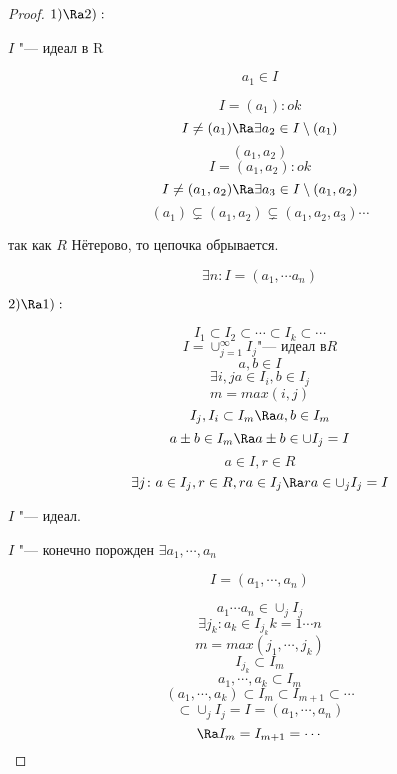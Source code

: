 \begin{proof}
\textbf{$1) \Ra 2):$}

$I$ "--- идеал в R

$$a_1 \in I$$

$$I = (a_1)\colon ok$$
$$I \ne (a_1) \Ra \exists a_2 \in I \setminus (a_1)$$
$$(a_1, a_2)$$
$$I = (a_1, a_2)\colon ok$$
$$I \ne (a_1, a_2) \Ra \exists a_3 \in I \setminus (a_1, a_2)$$
$$(a_1) \subsetneq (a_1, a_2) \subsetneq (a_1, a_2, a_3) \cdots$$

так как $R$ Нётерово, то цепочка обрывается. 

$$\exists n \colon  I = (a_1, \cdots a_n)$$

\textbf{$2) \Ra 1):$}

$$I_{1} \subset I_2 \subset \cdots \subset I_{k} \subset \cdots$$
$$I = \cup_{j = 1}^{\infty} I_{j} \text{"--- идеал в} R$$
$$a, b \in I$$
$$\exists i, j a \in I_{i}, b \in I_{j}$$
$$m = max(i, j)$$
$$I_j, I_i \subset I_{m} \Ra a, b \in I_{m}$$
$$a\pm b \in I_m \Ra a \pm b \in \cup I_{j} = I$$
$$a \in I, r \in R$$
$$\exists j \colon a \in I_j, r \in R, ra \in I_{j} \Ra ra \in \cup_{j}I_j = I$$

$I$ "--- идеал. 

$I$ "--- конечно порожден $\exists a_1, \cdots, a_n$

$$I = (a_1, \cdots, a_n)$$

$$a_1 \cdots a_n \in \cup_{j} I_j$$
$$\exists j_k\colon a_k \in I_{j_k} k = 1 \cdots n$$
$$m =max(j_1, \cdots, j_k)$$
$$I_{j_{k}} \subset I_m$$
$$a_1, \cdots, a_k \subset I_{m}$$
$$(a_1, \cdots, a_k) \subset I_m \subset I_{m + 1} \subset \cdots$$
$$\subset \cup_{j} I_{j} = I = (a_1, \cdots, a_n)$$
$$\Ra I_m = I_{m + 1} = \cdots$$
\end{proof}
